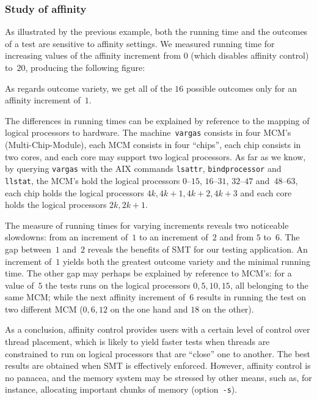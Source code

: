 \subsubsection{Study of affinity}
As illustrated by the previous example, both the running time and the outcomes
of a test are sensitive to affinity settings.
We measured running time for increasing values of the affinity increment
from $0$ (which disables affinity control)
to~$20$, producing the following figure:
\begin{center}\end{center}
As regards outcome variety,
we get all of the $16$ possible
outcomes only for an affinity increment of~$1$.

The differences in running times can be explained by reference to the mapping
of logical processors to hardware.
The machine~\texttt{vargas} consists in four MCM's (Multi-Chip-Module), each MCM
consists in four ``chips'', each chip consists in two cores, and
each core may support two logical processors.
As far as we know, by querying \texttt{vargas}
with the AIX commands
\texttt{lsattr}, \texttt{bindprocessor}
and \texttt{llstat},
the MCM's hold the logical processors
$0$--$15$, $16$--$31$, $32$--$47$ and~$48$--$63$,
each chip holds the logical processors $4k, 4k+1, 4k+2, 4k+3$
and each core holds the logical processors $2k, 2k+1$.

The measure of running times for varying increments
reveals two noticeable slowdowns:
from an increment of~$1$ to an increment of~$2$ and from $5$ to~$6$.
The gap between~$1$ and~$2$ reveals the benefits of
SMT for our testing application.
An increment of~$1$ yields both the greatest outcome
variety and the minimal running time.
The other gap may perhaps be explained by reference to MCM's:
for a value of~$5$ the tests runs on the logical processors
$0, 5, 10, 15$, all belonging to the same
MCM; while the next affinity increment of~$6$ results in
running the test on two different MCM ($0, 6, 12$ on the one hand
and $18$ on the other).


As a conclusion, affinity control provides users with a certain level
of control over thread placement, which is likely to yield faster tests when
threads are constrained to run on logical processors that are ``close'' one
to another.
The best results are obtained when SMT is effectively enforced.
However, affinity control is no panacea, and the memory system may
be stressed by other means, such as, for instance, allocating important
chunks of memory (option~\texttt{-s}).

